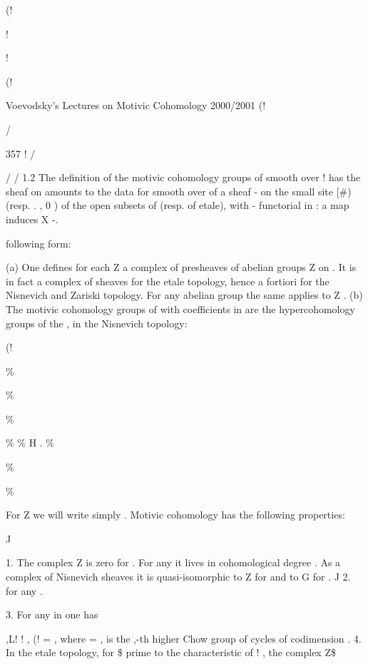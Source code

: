 \documentclass[11pt,a4paper]{article}
\theoremstyle{plain}
\theoremstyle{definition}
\begin{document}
(!

!

!

(!

Voevodsky's Lectures on Motivic Cohomology 2000/2001
(!

/


 

357
!
/

 

  / /
1.2 The definition of the motivic cohomology groups of  smooth over ! has the
sheaf on
amounts to the data for
smooth over of a sheaf - on the
small site [\#) (resp. .   , 0 ) of the open subsets
of
(resp. of
etale), with - functorial in : a map
induces
X
-.








following form:





(a) One defines for each  Z a complex of presheaves of abelian groups Z
on
. It is in fact a complex of sheaves for the etale topology, hence a
fortiori for the Nisnevich and Zariski topology. For any abelian group the
same applies to
Z .
(b) The motivic cohomology groups of with coefficients in are the hypercohomology groups of the
, in the Nisnevich topology:

(!

\%

\%

\% 

\%
   \% H .    \%

\%

\%

 

For
Z we will write simply 
.
Motivic cohomology has the following properties:



J



1. The complex Z
is zero for
. For any it lives in cohomological degree
. As a complex of Nisnevich sheaves it is quasi-isomorphic to Z for
and to G  for
.
J
2. 
for any  .

3. For any in
one has



 
   
 ,L!
!
, 
 (!
   =    ,
where =    , is the   ,-th higher Chow group of cycles of
codimension  .
4. In the etale topology, for \$ prime to the characteristic of ! , the complex Z\$
\end{document}
